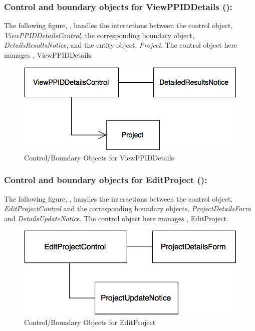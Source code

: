 \documentclass[12pt,letterpaper]{article}
\begin{document}
\subsubsection*{Control and boundary objects for ViewPPIDDetails ():}

The following figure, , handles the interactions between the control object, {\it ViewPPIDDetailsControl}, the corresponding boundary object, 
{\it DetailsResultsNotice}, and the entity object, {\it Project}. The control object here manages , ViewPPIDDetails.

\vspace{1em}

\begin{figure}[H]
	\centering{}
	\includegraphics[scale=0.37]{imgs/cbod/view-ppid-details.png}
	\caption{Control/Boundary Objects for ViewPPIDDetails}
\end{figure}

\newpage{}

\subsubsection*{Control and boundary objects for EditProject ():}

The following figure, , handles the interactions between the control object, {\it EditProjectControl} and the corresponding boundary objects, 
{\it ProjectDetailsForm} and {\it DetailsUpdateNotice}. The control object here manages , EditProject.

\begin{figure}[H]
	\centering{}
	\includegraphics[scale=0.37]{imgs/cbod/edit-project.png}
	\caption{Control/Boundary Objects for EditProject}
\end{figure}
\end{document}
